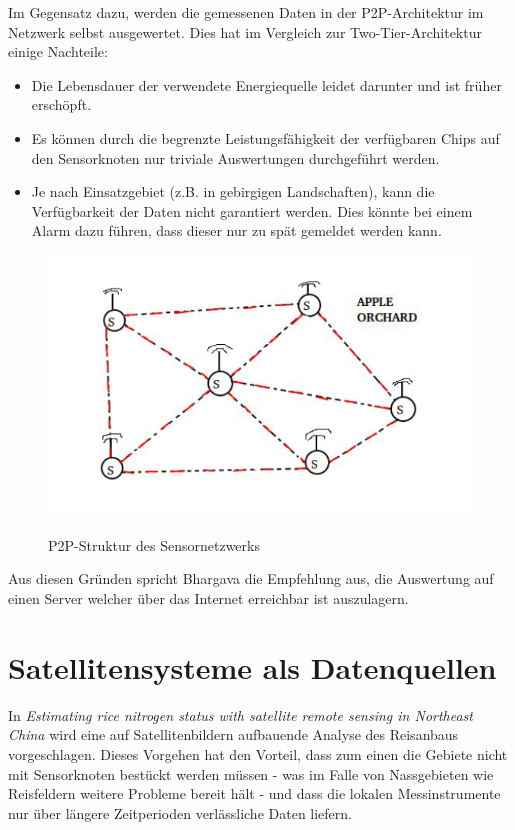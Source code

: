 Im Gegensatz dazu, werden die gemessenen Daten in der P2P-Architektur im Netzwerk selbst ausgewertet. Dies hat im Vergleich zur Two-Tier-Architektur einige Nachteile:
\begin{itemize}
	\item Die Lebensdauer der verwendete Energiequelle leidet darunter und ist früher erschöpft.
	\item Es können durch die begrenzte Leistungsfähigkeit der verfügbaren Chips auf den Sensorknoten nur triviale Auswertungen durchgeführt werden.
	\item Je nach Einsatzgebiet (z.B. in gebirgigen Landschaften), kann die Verfügbarkeit der Daten nicht garantiert werden. Dies könnte bei einem Alarm dazu führen, dass dieser nur zu spät gemeldet werden kann.
\end{itemize}

\begin{figure}[h]
 \includegraphics[scale=0.5,natwidth=\textwidth]{figures/sensors/p2p_architecture.png}
 \centering
 \label{fig:fmishierarchy}
 \caption{P2P-Struktur des Sensornetzwerks \cite{jour:Bhargava2014}}
\end{figure}

Aus diesen Gründen spricht Bhargava die Empfehlung aus, die Auswertung auf einen Server welcher über das Internet erreichbar ist auszulagern.\cite{jour:Bhargava2014}

\section{Satellitensysteme als Datenquellen}

In \textit{Estimating rice nitrogen status with satellite remote sensing in Northeast China} wird eine auf Satellitenbildern aufbauende Analyse des Reisanbaus vorgeschlagen. Dieses Vorgehen hat den Vorteil, dass zum einen die Gebiete nicht mit Sensorknoten bestückt werden müssen - was im Falle von Nassgebieten wie Reisfeldern weitere Probleme bereit hält - und dass die lokalen Messinstrumente nur über längere Zeitperioden verlässliche Daten liefern.\cite{jour:Huang2013} 

